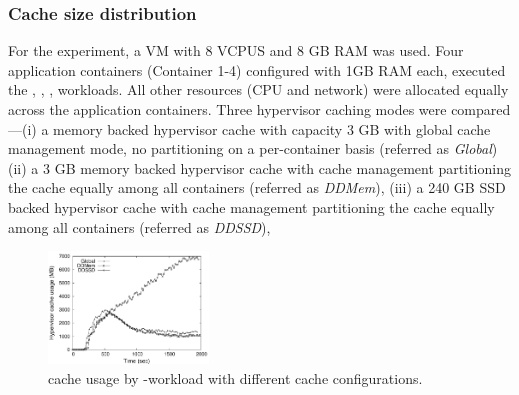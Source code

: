 \subsubsection{Cache size distribution}
For the experiment, a VM with 8 VCPUS and 8 GB RAM was used.
%
Four application containers (Container 1-4)  configured with 1GB RAM each,
executed the \web, \proxy, \mail, \video{} workloads.
%
All other resources (CPU and network) were allocated equally
across the application containers.  
%
Three hypervisor caching modes were compared---(i) a memory backed hypervisor cache 
with capacity 3 GB with global cache management mode, no
partitioning on a per-container basis (referred as \emph{Global}) %
(ii) a 3 GB memory backed hypervisor cache with 
\dd{} cache management partitioning the cache equally among all containers
(referred as \emph{DDMem}),
(iii) a 240 GB SSD backed hypervisor cache with 
\dd{} cache management partitioning the cache equally among all containers
(referred as \emph{DDSSD}),
% 

\begin{figure}[t]
  \centering
\includegraphics[width=0.38\textwidth]{data/correctness/only_video}
 \caption{\dd{} cache usage by \video-workload with different cache
          configurations.}
 \vspace{-0.5cm}
 \label{fig:video}
\end{figure} 




